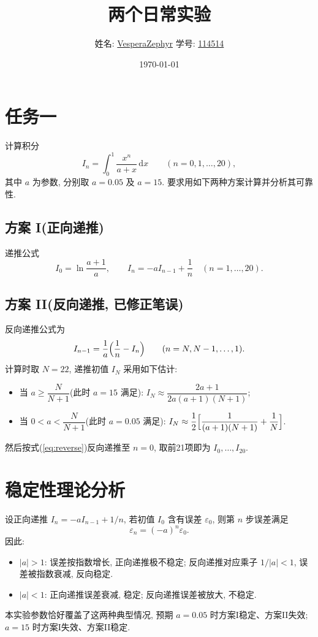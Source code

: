 \documentclass[12pt,a4paper]{ctexart}
\title{\textbf{两个日常实验}}
\author{姓名: \underline{VesperaZephyr} \quad 学号: \underline{114514}}
\date{\today}
\begin{document}
\maketitle
\tableofcontents
\newpage
\section{任务一}
计算积分
\begin{equation}\label{eq:In}
I_n = \int_0^1 \frac{x^n}{a + x}\, \mathrm{d}x \qquad (n = 0, 1, \dots, 20),
\end{equation}
其中 $a$ 为参数, 分别取 $a = 0.05$ 及 $a = 15$. 要求用如下两种方案计算并分析其可靠性. 

\subsection*{方案 I(正向递推)}
递推公式
\begin{equation}
I_0 = \ln\frac{a+1}{a}, \qquad I_n = -a I_{n-1} + \frac{1}{n}\quad (n=1,\dots,20).
\end{equation}

\subsection*{方案 II(反向递推, 已修正笔误)}
反向递推公式为
\begin{equation}\label{eq:reverse}
I_{n-1} = \frac{1}{a}\Bigl(\frac{1}{n} - I_n\Bigr) \qquad (n = N, N-1, \dots, 1).
\end{equation}
计算时取 $N=22$, 递推初值 $I_N$ 采用如下估计: 
\begin{itemize}
\item 当 $a \ge \dfrac{N}{N+1}$(此时 $a=15$ 满足): $I_N \approx \dfrac{2a+1}{2a(a+1)(N+1)}$; 
\item 当 $0 < a < \dfrac{N}{N+1}$(此时 $a=0.05$ 满足): $I_N \approx \dfrac{1}{2}\Bigl[\dfrac{1}{(a+1)(N+1)} + \dfrac{1}{N}\Bigr]$. 
\end{itemize}
然后按式(\ref{eq:reverse})反向递推至 $n=0$, 取前21项即为 $I_0,\dots,I_{20}$. 

\section{稳定性理论分析}
设正向递推 $I_n = -a I_{n-1} + 1/n$, 若初值 $I_0$ 含有误差 $\varepsilon_0$, 则第 $n$ 步误差满足
\begin{equation}
\varepsilon_n = (-a)^n \varepsilon_0 .
\end{equation}
因此: 
\begin{itemize}
\item $|a| > 1$: 误差按指数增长, 正向递推极不稳定; 反向递推对应乘子 $1/|a| < 1$, 误差被指数衰减, 反向稳定. 
\item $|a| < 1$: 正向递推误差衰减, 稳定; 反向递推误差被放大, 不稳定. 
\end{itemize}
本实验参数恰好覆盖了这两种典型情况, 预期 $a=0.05$ 时方案I稳定、方案II失效; $a=15$ 时方案I失效、方案II稳定. 
\end{document}
